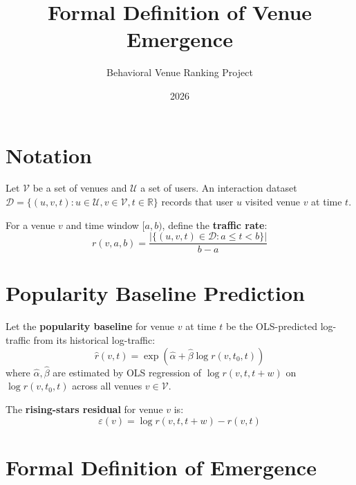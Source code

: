 \documentclass[11pt]{article}
\title{Formal Definition of Venue Emergence}
\author{Behavioral Venue Ranking Project}
\date{2026}
\begin{document}
\maketitle

\section{Notation}

Let $\mathcal{V}$ be a set of venues and $\mathcal{U}$ a set of users.
An interaction dataset $\mathcal{D} = \{(u, v, t) : u \in \mathcal{U}, v \in \mathcal{V}, t \in \mathbb{R}\}$
records that user $u$ visited venue $v$ at time $t$.

For a venue $v$ and time window $[a, b)$, define the \textbf{traffic rate}:
\begin{equation}
    r(v, a, b) = \frac{|\{(u, v, t) \in \mathcal{D} : a \leq t < b\}|}{b - a}
\end{equation}

\section{Popularity Baseline Prediction}

Let the \textbf{popularity baseline} for venue $v$ at time $t$ be the
OLS-predicted log-traffic from its historical log-traffic:
\begin{equation}
    \hat{r}(v, t) = \exp\!\left(\hat{\alpha} + \hat{\beta} \log r(v, t_0, t)\right)
\end{equation}
where $\hat{\alpha}, \hat{\beta}$ are estimated by OLS regression of
$\log r(v, t, t{+}w)$ on $\log r(v, t_0, t)$ across all venues $v \in \mathcal{V}$.

The \textbf{rising-stars residual} for venue $v$ is:
\begin{equation}
    \varepsilon(v) = \log r(v, t, t{+}w) - \hat{r}(v, t)
\end{equation}

\section{Formal Definition of Emergence}
\end{document}
